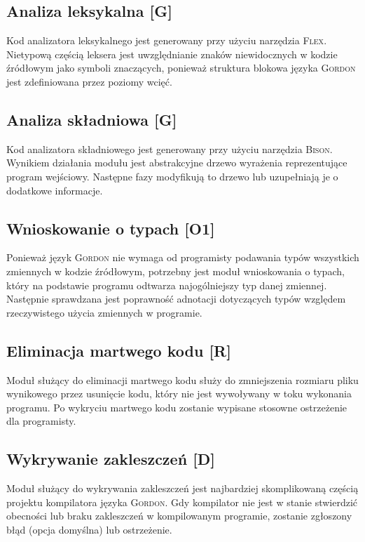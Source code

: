 \documentclass{documentation}
\begin{document}
\subsection{Analiza leksykalna [G]}
\noindent Kod analizatora leksykalnego jest generowany przy użyciu narzędzia \textsc{Flex}. Nietypową
częścią leksera jest uwzględnianie znaków niewidocznych w kodzie źródłowym jako
symboli znaczących, ponieważ struktura blokowa języka \textsc{Gordon} jest
zdefiniowana przez poziomy wcięć.  

\subsection{Analiza składniowa [G]}
\noindent Kod analizatora składniowego jest generowany przy użyciu narzędzia
\textsc{Bison}.  Wynikiem działania modułu jest abstrakcyjne drzewo wyrażenia
reprezentujące program wejściowy.  Następne fazy modyfikują to drzewo lub
uzupełniają je o dodatkowe informacje.

\subsection{Wnioskowanie o typach [O1]}
\noindent Ponieważ język \textsc{Gordon} nie wymaga od programisty podawania
typów wszystkich zmiennych w kodzie źródłowym, potrzebny jest moduł
wnioskowania o typach, który na podstawie programu odtwarza najogólniejszy typ
danej zmiennej. Następnie sprawdzana jest poprawność adnotacji dotyczących
typów względem rzeczywistego użycia zmiennych w programie.

\subsection{Eliminacja martwego kodu [R]}
\noindent Moduł służący do eliminacji martwego kodu służy do zmniejszenia rozmiaru pliku wynikowego
przez usunięcie kodu, który nie jest wywoływany w toku wykonania programu.
Po wykryciu martwego kodu zostanie wypisane stosowne ostrzeżenie dla programisty.

\subsection{Wykrywanie zakleszczeń [D]} \noindent Moduł służący do wykrywania
zakleszczeń jest najbardziej skomplikowaną częścią projektu kompilatora języka
\textsc{Gordon}. Gdy kompilator nie jest w stanie stwierdzić
obecności lub braku zakleszczeń w kompilowanym programie, zostanie zgłoszony
błąd (opcja domyślna) lub ostrzeżenie.
\end{document}
